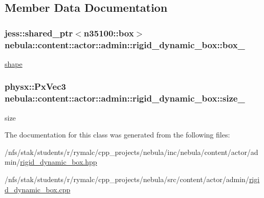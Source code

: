 \subsection{Member Data Documentation}
\hypertarget{classnebula_1_1content_1_1actor_1_1admin_1_1rigid__dynamic__box_a68147cc3bbe6f978b152540a0caa72cd}{
\subsubsection[{box\_\-}]{\setlength{\rightskip}{0pt plus 5cm}jess::shared\_\-ptr$<${\bf n35100::box}$>$ {\bf nebula::content::actor::admin::rigid\_\-dynamic\_\-box::box\_\-}}}
\label{classnebula_1_1content_1_1actor_1_1admin_1_1rigid__dynamic__box_a68147cc3bbe6f978b152540a0caa72cd}


\hyperlink{namespacenebula_1_1content_1_1shape}{shape} \hypertarget{classnebula_1_1content_1_1actor_1_1admin_1_1rigid__dynamic__box_a67f543464bdf8b405b1c20a2d508ad0c}{
\subsubsection[{size\_\-}]{\setlength{\rightskip}{0pt plus 5cm}physx::PxVec3 {\bf nebula::content::actor::admin::rigid\_\-dynamic\_\-box::size\_\-}}}
\label{classnebula_1_1content_1_1actor_1_1admin_1_1rigid__dynamic__box_a67f543464bdf8b405b1c20a2d508ad0c}


size 

The documentation for this class was generated from the following files:\begin{DoxyCompactItemize}
\item 
/nfs/stak/students/r/rymalc/cpp\_\-projects/nebula/inc/nebula/content/actor/admin/\hyperlink{admin_2rigid__dynamic__box_8hpp}{rigid\_\-dynamic\_\-box.hpp}\item 
/nfs/stak/students/r/rymalc/cpp\_\-projects/nebula/src/content/actor/admin/\hyperlink{admin_2rigid__dynamic__box_8cpp}{rigid\_\-dynamic\_\-box.cpp}\end{DoxyCompactItemize}
